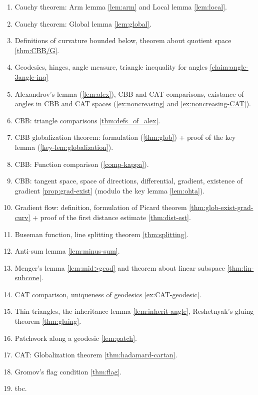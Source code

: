 \begin{enumerate}
\item Cauchy theorem: Arm lemma \ref{lem:arm} and Local lemma \ref{lem:local}.
\item Cauchy theorem: Global lemma \ref{lem:global}.
\item Definitions of curvature bounded below, theorem about quotient space \ref{thm:CBB/G}.
\item Geodesics, hinges, angle measure, triangle inequality for angles \ref{claim:angle-3angle-inq}
\item Alexandrov's lemma (\ref{lem:alex}), CBB and CAT comparisons,
existance of angles in CBB and CAT spaces (\ref{ex:noncreasing} and \ref{ex:noncreasing-CAT}).
\item CBB: triangle comparisons \ref{thm:defs_of_alex}.
\item CBB globalization theorem: formulation (\ref{thm:glob})  + proof of the key lemma (\ref{key-lem:globalization}). 
\item CBB: Function comparison (\ref{comp-kappa}).
\item CBB: tangent space, space of directions, differential, gradient, existence of gradient \ref{prop:grad-exist} (modulo the key lemma \ref{lem:ohta}).
\item Gradient flow: definition, formulation of Picard theorem \ref{thm:glob-exist-grad-curv} + proof of the first distance estimate \ref{thm:dist-est}.
\item Buseman function, line splitting theorem \ref{thm:splitting}.
\item Anti-sum lemma \ref{lem:minus-sum}.
\item Menger’s lemma \ref{lem:mid>geod} and theorem about linear subspace \ref{thm:lin-subcone}.
\item CAT comparison, uniqueness of geodesics \ref{ex:CAT-geodesic}.
\item Thin triangles, the inheritance lemma \ref{lem:inherit-angle}, Reshetnyak's gluing theorem \ref{thm:gluing}.
\item Patchwork along a geodesic \ref{lem:patch}.
\item CAT: Globalization theorem \ref{thm:hadamard-cartan}.
\item Gromov's flag condition \ref{thm:flag}.
\item tbc.
\end{enumerate}

